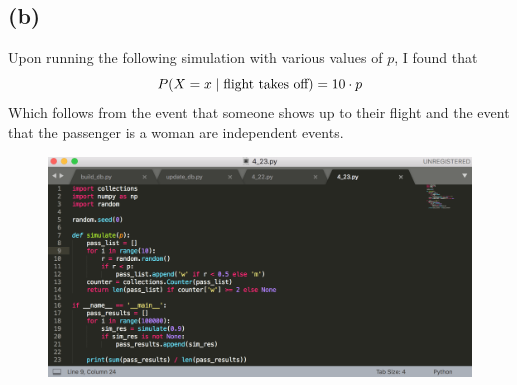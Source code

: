 \documentclass[11pt]{article}
\begin{document}
\subsection*{(b)}
Upon running the following simulation with various values of $p$, I found that
\[P(X=x\hspace{1mm}|\hspace{1mm}\text{flight takes off})=10\cdot p\]
Which follows from the event that someone shows up to their flight and the event that the passenger is a woman are independent events.
\begin{figure}[h!]
	\centering
	\includegraphics[width=\textwidth]{4_23.png}
\end{figure}
\end{document}
